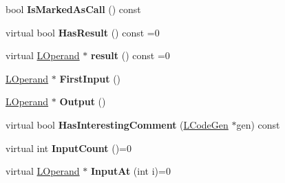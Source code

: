 \begin{DoxyCompactItemize}
\item 
bool {\bfseries Is\+Marked\+As\+Call} () const \hypertarget{classv8_1_1internal_1_1_l_instruction_afb5aff9204835a6dcec75538e3da4b2f}{}\label{classv8_1_1internal_1_1_l_instruction_afb5aff9204835a6dcec75538e3da4b2f}

\item 
virtual bool {\bfseries Has\+Result} () const  =0\hypertarget{classv8_1_1internal_1_1_l_instruction_af38ca7b40171f2ed75a2970ac7e15fd8}{}\label{classv8_1_1internal_1_1_l_instruction_af38ca7b40171f2ed75a2970ac7e15fd8}

\item 
virtual \hyperlink{classv8_1_1internal_1_1_l_operand}{L\+Operand} $\ast$ {\bfseries result} () const  =0\hypertarget{classv8_1_1internal_1_1_l_instruction_a3c5b856bb92c72dabcf08086abf6f8d7}{}\label{classv8_1_1internal_1_1_l_instruction_a3c5b856bb92c72dabcf08086abf6f8d7}

\item 
\hyperlink{classv8_1_1internal_1_1_l_operand}{L\+Operand} $\ast$ {\bfseries First\+Input} ()\hypertarget{classv8_1_1internal_1_1_l_instruction_ad9675d1c06250b28199f105835b80329}{}\label{classv8_1_1internal_1_1_l_instruction_ad9675d1c06250b28199f105835b80329}

\item 
\hyperlink{classv8_1_1internal_1_1_l_operand}{L\+Operand} $\ast$ {\bfseries Output} ()\hypertarget{classv8_1_1internal_1_1_l_instruction_ac4116b2faee2d8d3f0d7d21a27b40ad4}{}\label{classv8_1_1internal_1_1_l_instruction_ac4116b2faee2d8d3f0d7d21a27b40ad4}

\item 
virtual bool {\bfseries Has\+Interesting\+Comment} (\hyperlink{classv8_1_1internal_1_1_l_code_gen}{L\+Code\+Gen} $\ast$gen) const \hypertarget{classv8_1_1internal_1_1_l_instruction_affae35afdf10150a226c035d47b8ce27}{}\label{classv8_1_1internal_1_1_l_instruction_affae35afdf10150a226c035d47b8ce27}

\item 
virtual int {\bfseries Input\+Count} ()=0\hypertarget{classv8_1_1internal_1_1_l_instruction_a10b5af4413b64db11db6f4dc266b5e4f}{}\label{classv8_1_1internal_1_1_l_instruction_a10b5af4413b64db11db6f4dc266b5e4f}

\item 
virtual \hyperlink{classv8_1_1internal_1_1_l_operand}{L\+Operand} $\ast$ {\bfseries Input\+At} (int i)=0\hypertarget{classv8_1_1internal_1_1_l_instruction_a65f5b87101a6f411d73e5ba9aa13a675}{}\label{classv8_1_1internal_1_1_l_instruction_a65f5b87101a6f411d73e5ba9aa13a675}


\end{DoxyCompactItemize}
